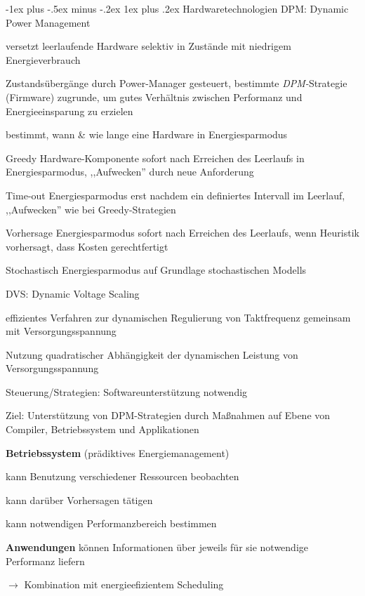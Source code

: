 \documentclass[a4paper]{article}
\makeatletter
\renewcommand{\subsubsection}{\@startsection{subsubsection}{3}{0mm}%
 {-1ex plus -.5ex minus -.2ex}%
 {1ex plus .2ex}%
 {\normalfont\small\bfseries}}
\makeatother
\begin{document}
\begin{multicols}{3}
    \subsubsection{Hardwaretechnologien}
    DPM: Dynamic Power Management
    \begin{itemize*}
        \item versetzt leerlaufende Hardware selektiv in Zustände mit niedrigem Energieverbrauch
        \item Zustandsübergänge durch Power-Manager gesteuert, bestimmte \emph{DPM-}Strategie (Firmware) zugrunde, um gutes Verhältnis zwischen Performanz und Energieeinsparung zu erzielen
        \item bestimmt, wann \& wie lange eine Hardware in Energiesparmodus
    \end{itemize*}
    \begin{description*}
        \item[Greedy] Hardware-Komponente sofort nach Erreichen des Leerlaufs in Energiesparmodus, ,,Aufwecken'' durch neue Anforderung
        \item[Time-out] Energiesparmodus erst nachdem ein definiertes Intervall im Leerlauf, ,,Aufwecken'' wie bei Greedy-Strategien
        \item[Vorhersage] Energiesparmodus sofort nach Erreichen des Leerlaufs, wenn Heuristik vorhersagt, dass Kosten gerechtfertigt
        \item[Stochastisch] Energiesparmodus auf Grundlage stochastischen Modells
    \end{description*}

    DVS: Dynamic Voltage Scaling
    \begin{itemize*}
        \item effizientes Verfahren zur dynamischen Regulierung von Taktfrequenz gemeinsam mit Versorgungsspannung
        \item Nutzung quadratischer Abhängigkeit der dynamischen Leistung von Versorgungsspannung
        \item Steuerung/Strategien: Softwareunterstützung notwendig
        \item Ziel: Unterstützung von DPM-Strategien durch Maßnahmen auf Ebene von Compiler, Betriebssystem und Applikationen
        \item \textbf{Betriebssystem} (prädiktives Energiemanagement)
        \begin{itemize*}
            \item kann Benutzung verschiedener Ressourcen beobachten
            \item kann darüber Vorhersagen tätigen
            \item kann notwendigen Performanzbereich bestimmen
        \end{itemize*}
        \item \textbf{Anwendungen} können Informationen über jeweils für sie notwendige Performanz liefern
        \item[$\rightarrow$] Kombination mit energieefizientem Scheduling
    \end{itemize*}


\end{multicols}
\end{document}
